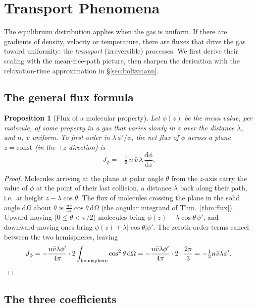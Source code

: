 \documentclass[11pt,a4paper]{report}
\theoremstyle{definition}
\theoremstyle{plain}
\newtheorem{proposition}[definition]{Proposition}
\newcommand{\dd}{\mathrm{d}}
\newcommand{\vbar}{\bar{v}}
\begin{document}
\section{Transport Phenomena}
\label{sec:transport}

The equilibrium distribution applies when the gas is uniform. If there are gradients of density, velocity or temperature, there are fluxes that drive the gas toward uniformity: the \emph{transport} (irreversible) processes. We first derive their scaling with the mean-free-path picture, then sharpen the derivation with the relaxation-time approximation in \S\ref{sec:boltzmann}.

\subsection{The general flux formula}

\begin{proposition}[Flux of a molecular property]\label{prop:genflux}
Let $\phi(z)$ be the mean value, per molecule, of some property in a gas that varies slowly in $z$ over the distance $\lambda$, and $n$, $\vbar$ uniform. To first order in $\lambda\,\phi'/\phi$, the net flux of $\phi$ across a plane $z=\mathrm{const}$ (in the $+z$ direction) is
\begin{equation}
J_\phi=-\tfrac13\,n\,\vbar\,\lambda\,\frac{\dd\phi}{\dd z}.
\label{eq:genflux}
\end{equation}
\end{proposition}
\begin{proof}
Molecules arriving at the plane at polar angle $\theta$ from the $z$-axis carry the value of $\phi$ at the point of their last collision, a distance $\lambda$ back along their path, i.e.\ at height $z-\lambda\cos\theta$. The flux of molecules crossing the plane in the solid angle $\dd\Omega$ about $\theta$ is $\frac{n\vbar}{4\pi}\cos\theta\,\dd\Omega$ (the angular integrand of Thm.~\ref{thm:flux}). Upward-moving ($0\le\theta<\pi/2$) molecules bring $\phi(z)-\lambda\cos\theta\,\phi'$, and downward-moving ones bring $\phi(z)+\lambda|\cos\theta|\phi'$. The zeroth-order terms cancel between the two hemispheres, leaving
\[
J_\phi=-\frac{n\vbar\lambda\phi'}{4\pi}\cdot2\int_{\rm hemisphere}\cos^2\theta\,\dd\Omega
=-\frac{n\vbar\lambda\phi'}{4\pi}\cdot2\cdot\frac{2\pi}{3}=-\tfrac13n\vbar\lambda\phi' .
\]
\end{proof}

\subsection{The three coefficients}
\end{document}
